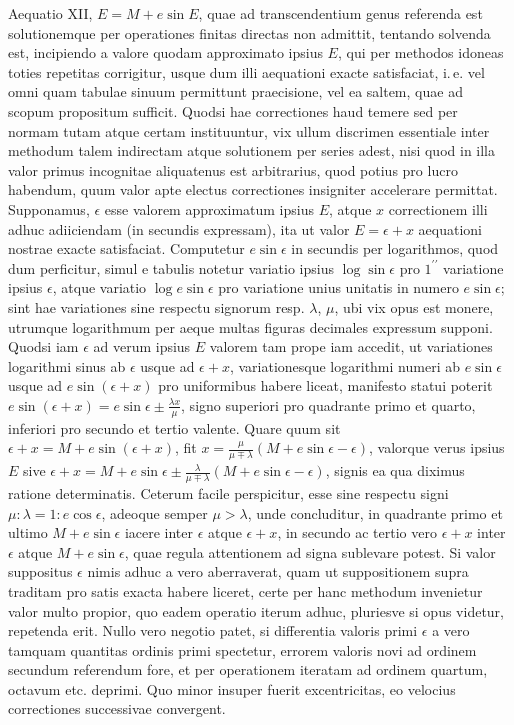 Aequatio XII, $E = M + e\sin E$, quae ad transcendentium genus referenda est solutionemque per operationes finitas directas non admittit, tentando solvenda est, incipiendo a valore quodam approximato ipsius $E$, qui per methodos idoneas toties repetitas corrigitur, usque dum illi aequationi exacte satisfaciat, i.\,e. vel omni quam tabulae sinuum permittunt praecisione, vel ea saltem, quae ad scopum propositum sufficit. Quodsi hae correctiones haud temere sed per normam tutam atque certam instituuntur, vix ullum discrimen essentiale inter methodum talem indirectam atque solutionem per series adest, nisi quod in illa valor primus incognitae aliquatenus est arbitrarius, quod potius pro lucro habendum, quum valor apte electus correctiones insigniter accelerare permittat. Supponamus, $\epsilon$ esse valorem approximatum ipsius $E$, atque $x$ correctionem illi adhuc adiiciendam (in secundis expressam), ita ut valor $E = \epsilon + x$ aequationi nostrae exacte satisfaciat. Computetur $e\sin\epsilon$ in secundis per logarithmos, quod dum perficitur, simul e tabulis notetur variatio ipsius $\log\sin\epsilon$ pro $1^{\prime\prime}$ variatione ipsius $\epsilon$, atque variatio $\log e\sin\epsilon$ pro variatione unius unitatis in numero $e\sin\epsilon$; sint hae variationes sine respectu signorum resp. $\lambda$, $\mu$, ubi vix opus est monere, utrumque logarithmum per aeque multas figuras decimales expressum supponi. Quodsi iam $\epsilon$ ad verum ipsius $E$ valorem tam prope iam accedit, ut variationes logarithmi sinus ab $\epsilon$ usque ad $\epsilon+x$, variationesque logarithmi numeri ab $e\sin\epsilon$ usque ad $e\sin(\epsilon+x)$ pro uniformibus habere liceat, manifesto statui poterit $e\sin(\epsilon+x) = e\sin\epsilon \pm \frac{\lambda x}{\mu}$, signo superiori pro quadrante primo et quarto, inferiori pro secundo et tertio valente. Quare quum sit $\epsilon+x = M+e\sin(\epsilon+x)$, fit $x = \frac{\mu}{\mu\mp\lambda}(M+e\sin\epsilon-\epsilon)$, valorque verus ipsius $E$ sive $\epsilon+x = M+e\sin\epsilon \pm \frac{\lambda}{\mu\mp\lambda}(M+e\sin\epsilon-\epsilon)$, signis ea qua diximus ratione determinatis. Ceterum facile perspicitur, esse sine respectu signi $\mu:\lambda = 1:e\cos\epsilon$, adeoque semper $\mu > \lambda$, unde concluditur, in quadrante primo et ultimo $M+e\sin\epsilon$ iacere inter $\epsilon$ atque $\epsilon+x$, in secundo ac tertio vero $\epsilon+x$ inter $\epsilon$ atque $M+e\sin\epsilon$, quae regula attentionem ad signa sublevare potest. Si valor suppositus $\epsilon$ nimis adhuc a vero aberraverat, quam ut suppositionem supra traditam pro satis exacta habere liceret, certe per hanc methodum invenietur valor multo propior, quo eadem operatio iterum adhuc, pluriesve si opus videtur, repetenda erit. Nullo vero negotio patet, si differentia valoris primi $\epsilon$ a vero tamquam quantitas ordinis primi spectetur, errorem valoris novi ad ordinem secundum referendum fore, et per operationem iteratam ad ordinem quartum, octavum etc. deprimi. Quo minor insuper fuerit excentricitas, eo velocius correctiones successivae convergent.
